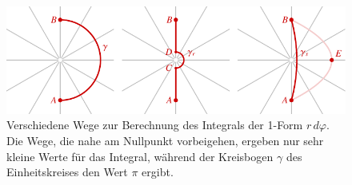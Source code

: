 %
%
%
\begin{figure}
\centering
\includegraphics{chapters/030-kurvenintegral/images/wege.pdf}
\caption{Verschiedene Wege zur Berechnung des Integrals der 1-Form
$r\,d\varphi$.
Die Wege, die nahe am Nullpunkt vorbeigehen, ergeben nur sehr kleine
Werte für das Integral, während der Kreisbogen $\gamma$ des
Einheitskreises den Wert $\pi$ ergibt.
\label{buch:kurvenintegral:differential:fig:wege}}
\end{figure}
